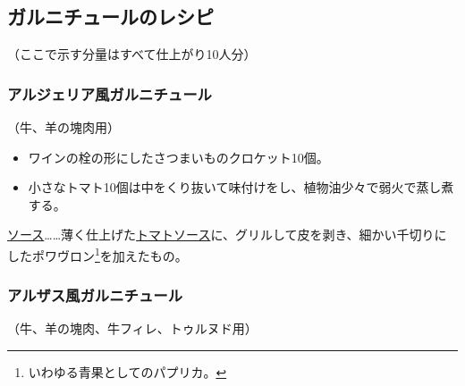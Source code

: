 \hypertarget{garnitures-recettes}{%
\subsection{ガルニチュールのレシピ}\label{garnitures-recettes}}


\begin{center}
\medlarge（ここで示す分量はすべて仕上がり10人分）
\end{center}
\normalsize
\begin{recette}
\hypertarget{garniture-algerienne}{%
\subsubsection{アルジェリア風ガルニチュール}\label{garniture-algerienne}}



（牛、羊の塊肉用）

\begin{itemize}
\item
  ワインの栓の形にしたさつまいものクロケット10個。
\item
  小さなトマト10個は中をくり抜いて味付けをし、植物油少々で弱火で蒸し煮する。
\end{itemize}

\ul{ソース}\ldots{}\ldots{}薄く仕上げた\protect\hyperlink{sauce-tomate}{トマトソース}に、グリルして皮を剥き、細かい千切りにしたポワヴロン\footnote{いわゆる青果としてのパプリカ。}を加えたもの。

\hypertarget{garniture-alsacienne}{%
\subsubsection{アルザス風ガルニチュール}\label{garniture-alsacienne}}



（牛、羊の塊肉、牛フィレ、トゥルヌド用）


\end{recette}
